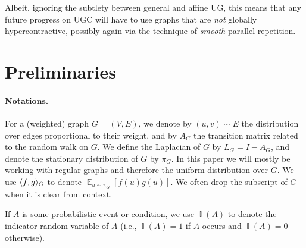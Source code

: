 \documentclass[11pt]{article}
\DeclareMathOperator*{\E}{\mathbb{E}}
\DeclareMathOperator*{\Ind}{\mathbb{I}}
\DeclarePairedDelimiter\ip{\langle}{\rangle}
\def \val {\mathrm{val}}
\newtheorem{definition}[theorem]{Definition}
\theoremstyle{definition}
\begin{document}
Albeit, ignoring the subtlety between general and affine UG, this means that any future progress on UGC will have to use graphs that are \emph{not} 
globally hypercontractive, possibly again 
via the technique of \emph{smooth} parallel repetition. 


\section{Preliminaries}\label{sec:prelims-sos} 

\paragraph{Notations.} 
For a (weighted) graph $G=(V,E)$, we denote by $(u,v) \sim E$ the distribution over edges proportional to their weight, and by $A_G$ the transition matrix related to the random walk on $G$.
We define the Laplacian of $G$ by $L_G = I - A_G$, and denote the stationary distribution of $G$ by $\pi_G$. In this paper we will mostly be working with regular graphs and therefore the uniform distribution over $G$. We use $\ip{f,g}_G$ to denote $\E_{u \sim \pi_G}[f(u)g(u)]$. We often drop the subscript of $G$ when it is clear from context. 

If $A$ is some probabilistic event or condition, we use $\Ind(A)$ to denote the indicator random variable of $A$ (i.e., $\Ind(A)=1$ if $A$ occurs and $\Ind(A)=0$ otherwise). 



\end{document}
